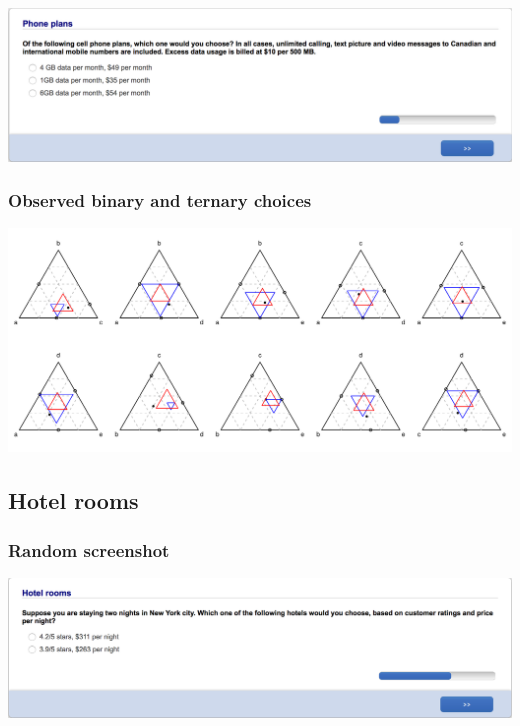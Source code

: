 \documentclass[11pt,letter]{article}
\begin{document}
\includegraphics[width=15cm]{Population_study_design/screenshot_phone_plans.png}

\subsubsection*{Observed binary and ternary choices}

\includegraphics[width=15cm]{./Population_study_data/Simplexes/phone_plans.pdf}

\pagebreak

\subsection*{Hotel rooms}



\subsubsection*{Random screenshot}

\includegraphics[width=15cm]{Population_study_design/screenshot_hotel_rooms.png}
\end{document}
